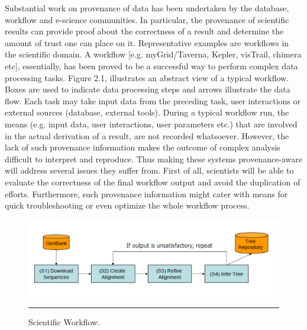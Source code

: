 Substantial work on provenance of data has been undertaken by the database, workflow\cite{reference6:5}\cite{reference6:9} and e-science communities.  In particular, the provenance of scientific results can provide proof about the correctness of a result and determine the amount of trust one can place on it\cite{reference5}\cite{reference36}. Representative examples are workflows in the scientific domain. A workflow [e.g. myGrid/Taverna\cite{reference6:18}, Kepler\cite{reference6:6}, visTrail\cite{reference6:13}, chimera\cite{reference6:12} etc], essentially, has been proved to be a successful way to perform complex data processing tasks. Figure 2.1, illustrates an abstract view of a typical workflow. Boxes are used to indicate data processing steps and arrows illustrate the data flow. Each task may take input data from the preceding task, user interactions or external sources (database, external tools).  During a typical workflow run, the means (e.g. input data, user interactions, user parameters etc.) that are involved in the actual derivation of a result, are not recorded whatsoever.  However, the lack of such provenance information makes the outcome of complex analysis difficult to interpret and reproduce. Thus making these systems provenance-aware will address several issues they suffer from. First of all, scientists will be able to evaluate the correctness of the final workflow output and avoid the duplication of efforts. Furthermore, such provenance information might cater with means for quick troubleshooting or even optimize the whole workflow process\cite{reference1:278}.

\begin{figure}[htbp]
	\centering
		\includegraphics[scale=0.50]{./Figures/chapter2/figure1.pdf}
		\rule{35em}{0.5pt}
	\caption[Scientific Workflow]{Scientific Workflow.\cite{reference6}}
	\label{fig:scientificWorkflow}
\end{figure}


